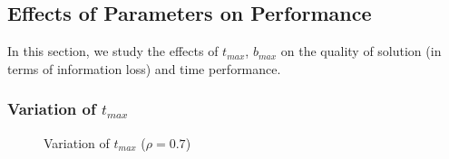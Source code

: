 \subsection{Effects of Parameters on Performance}\label{sec:eval:effect}
In this section, 
we study the effects of $t_{max}$, $b_{max}$ on the
quality of solution (in terms of information loss) and time performance.

\subsubsection{Variation of $t_{max}$}\label{sec:eval:timebound}

\begin{figure}[tb]
\centering
{}
\caption{Variation of $t_{max}$ ($\rho = 0.7$)}\label{fig:timebound}
\end{figure}

